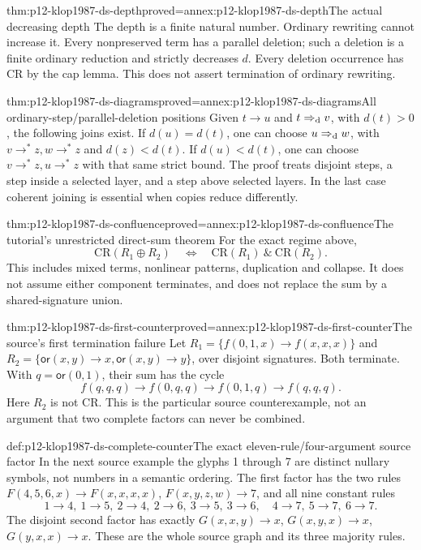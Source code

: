 \begin{hblemma}{thm:p12-klop1987-ds-depth}{proved=annex:p12-klop1987-ds-depth}{The actual decreasing depth}
The depth is a finite natural number. Ordinary rewriting cannot
increase it. Every nonpreserved term has a parallel deletion;
such a deletion is a finite ordinary reduction and strictly
decreases \(d\). Every deletion occurrence has CR by the cap
lemma. This does not assert termination of ordinary rewriting.
\end{hblemma}

\begin{hblemma}{thm:p12-klop1987-ds-diagrams}{proved=annex:p12-klop1987-ds-diagrams}{All ordinary-step/parallel-deletion positions}
Given \(t\to u\) and \(t\Rightarrow_{\rm d}v\), with
\(d(t)>0\), the following joins exist.
If \(d(u)=d(t)\), one can choose
\(u\Rightarrow_{\rm d}w\), with \(v\to^*z,w\to^*z\)
and \(d(z)<d(t)\). If \(d(u)<d(t)\), one can choose
\(v\to^*z,u\to^*z\) with that same strict bound.
The proof treats disjoint steps, a step inside a selected layer,
and a step above selected layers. In the last case coherent
joining is essential when copies reduce differently.
\end{hblemma}

\begin{hbtheorem}{thm:p12-klop1987-ds-confluence}{proved=annex:p12-klop1987-ds-confluence}{The tutorial's unrestricted direct-sum theorem}
For the exact regime above,
\[
 \mathrm{CR}(R_1\oplus R_2)
 \quad\Longleftrightarrow\quad
 \mathrm{CR}(R_1)\ \mathbin{\&}\ \mathrm{CR}(R_2).
\]
This includes mixed terms, nonlinear patterns, duplication and
collapse. It does not assume either component terminates, and
does not replace the sum by a shared-signature union.
\end{hbtheorem}

\begin{hbtheorem}{thm:p12-klop1987-ds-first-counter}{proved=annex:p12-klop1987-ds-first-counter}{The source's first termination failure}
Let \(R_1=\{f(0,1,x)\to f(x,x,x)\}\) and
\(R_2=\{\mathsf{or}(x,y)\to x,\mathsf{or}(x,y)\to y\}\),
over disjoint signatures. Both terminate. With
\(q=\mathsf{or}(0,1)\), their sum has the cycle
\[
 f(q,q,q)\to f(0,q,q)\to f(0,1,q)\to f(q,q,q).
\]
Here \(R_2\) is not CR. This is the particular source counterexample,
not an argument that two complete factors can never be combined.
\end{hbtheorem}

\begin{hbdefinition}{def:p12-klop1987-ds-complete-counter}{The exact eleven-rule/four-argument source factor}
In the next source example the glyphs 1 through 7 are distinct
nullary symbols, not numbers in a semantic ordering. The first
factor has the two rules
\(F(4,5,6,x)\to F(x,x,x,x)\),
\(F(x,y,z,w)\to7\), and all nine constant rules
\[
1\to4,\ 1\to5,\ 2\to4,\ 2\to6,\ 3\to5,\ 3\to6,
\quad4\to7,\ 5\to7,\ 6\to7.
\]
The disjoint second factor has exactly
\(G(x,x,y)\to x\), \(G(x,y,x)\to x\),
\(G(y,x,x)\to x\).
These are the whole source graph and its three majority rules.
\end{hbdefinition}

